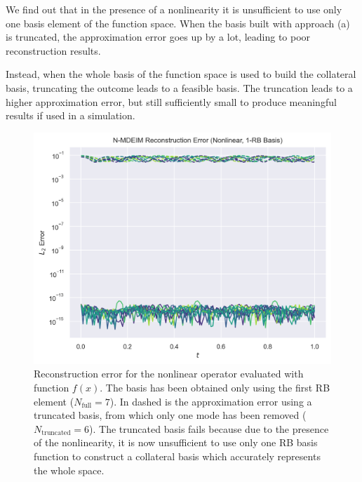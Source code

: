 \documentclass[../../thesis.tex]{subfiles}
\begin{document}
We find out that in the presence of a nonlinearity it is unsufficient to use only 
one basis element of the function space. 
When the basis built with approach (a) is truncated, the approximation error goes up by a lot,
leading to poor reconstruction results.

Instead, when the whole basis of the function space is used to build the collateral basis,
truncating the outcome leads to a feasible basis. 
The truncation leads to a higher approximation error, but still sufficiently small to produce
meaningful results if used in a simulation.    

\begin{figure}[h]
    \includegraphics[width=\columnwidth]{research_project/piston/figures/svd_fourier/trilinear_nonlinear/rb_basis_mdeim_errors_nonlinear_num_1.png}
    \caption{Reconstruction error for the nonlinear operator evaluated with function $f(x)$.
    The basis has been obtained only using the first RB element ($N_{\text{full}}=7$).
    In dashed is the approximation error using a truncated basis, 
    from which only one mode has been removed ($N_{\text{truncated}}=6$). 
    The truncated basis fails because due to the presence of the nonlinearity, 
    it is now unsufficient to use only one RB basis function 
    to construct a collateral basis which accurately represents the whole space.}
    \label{fig:appendix_rb_nonlinear_num_1}
\end{figure}
\end{document}
